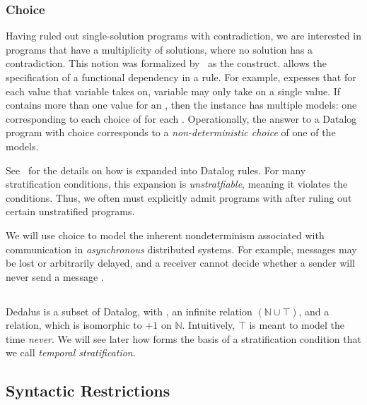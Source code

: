 \subsubsection{Choice}
Having ruled out single-solution programs with contradiction, we are interested in programs that have a multiplicity of solutions, where no solution has a contradiction.  This notion was formalized by~\cite{greedychoice} as the  construct.   allows the specification of a functional dependency in a rule.  For example,  expesses that for each value that variable  takes on, variable  may only take on a single value.  If  contains more than one  value for an , then the instance has multiple models: one corresponding to each choice of  for each .  Operationally, the answer to a Datalog program with choice corresponds to a {\em non-deterministic choice} of one of the models.

See~\cite{greedychoice} for the details on how  is expanded into Datalog rules.  For many stratification conditions, this expansion is {\em unstratfiable}, meaning it violates the conditions.  Thus, we often must explicitly admit programs with  after ruling out certain unstratified programs.

We will use choice to model the inherent nondeterminism associated with communication in {\em asynchronous} distributed systems.  For example, messages may be lost or arbitrarily delayed, and a receiver cannot decide whether a sender will never send a message .

\subsection{\lang}
Dedalus is a subset of Datalog, with , an infinite  relation $(\mathbb{N} \cup \top)$, and a  relation, which is isomorphic to $+1$ on $\mathbb{N}$.  Intuitively, $\top$ is meant to model the time {\em never}.  We will see later how  forms the basis of a stratification condition that we call {\em temporal stratification}.

\subsection{Syntactic Restrictions}
\label{sec:syntaxrestrictions}


